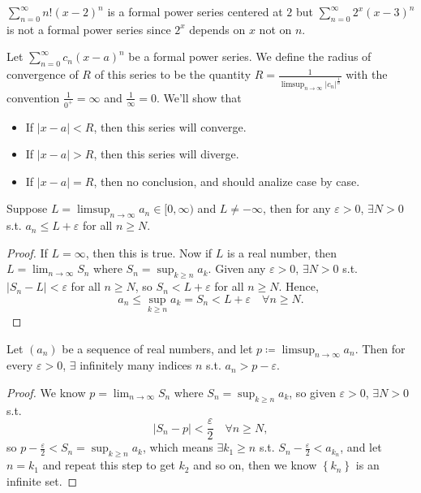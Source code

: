 \begin{eg}
    \(\sum_{n=0}^{\infty} n! (x-2)^n \) is a formal power series centered at \(2\) but \(\sum_{n=0}^{\infty} 2^x (x-3)^n \) is not a formal power series since \(2^x\) depends on \(x\) not on \(n\).      
\end{eg}

\begin{definition}
    Let \(\sum_{n=0}^{\infty} c_n(x-a)^n \) be a formal power series. We define the radius of convergence of \(R \) of this series to be the quantity \(R=\frac{1}{\limsup_{n \to \infty} \vert c_n \vert^{\frac{1}{n}} }\) with the convention \(\frac{1}{0^+} = \infty \) and \(\frac{1}{\infty } = 0\). We'll show that 
    \begin{itemize}
        \item If \(\vert x-a \vert < R\), then this series will converge. 
        \item If \(\vert x - a \vert > R \), then this series will diverge. 
        \item If \(\vert x-a \vert = R \), then no conclusion, and should analize case by case.   
    \end{itemize}   
\end{definition}

\begin{lemma} \label{lm: series approaches limsup}
    Suppose \(L = \limsup_{n \to \infty} a_n \in [0, \infty ) \) and \(L \neq -\infty \), then for any \(\varepsilon > 0\), \(\exists N > 0\) s.t. \(a_n \le L + \varepsilon \) for all \(n \ge N\).      
\end{lemma}
\begin{proof}
    If \(L = \infty \), then this is true. Now if \(L\) is a real number, then \(L = \lim_{n \to \infty} S_n \) where \(S_n = \sup _{k \ge n} a_k\). Given any \(\varepsilon > 0\), \(\exists N > 0\) s.t. \(\vert S_n - L \vert < \varepsilon  \) for all \(n \ge N\), so \(S_n < L + \varepsilon \) for all \(n \ge N\). Hence, 
    \[
        a_n \le \sup _{k \ge n} a_k = S_n < L + \varepsilon \quad \forall n \ge N.
    \]          
\end{proof}

\begin{lemma} \label{lm: given any veps we can find infinitely many an approach limsup in error veps}
    Let \((a_n)\) be a sequence of real numbers, and let \(p \coloneqq \limsup_{n \to \infty} a_n \). Then for every \(\varepsilon > 0\), \(\exists \) infinitely many indices \(n\) s.t. \(a_n > p - \varepsilon \).     
\end{lemma}
\begin{proof}
    We know \(p = \lim_{n \to \infty} S_n \) where \(S_n = \sup _{k \ge n} a_k\), so given \(\varepsilon > 0\), \(\exists N > 0\) s.t. 
    \[
        \left\vert S_n - p \right\vert < \frac{\varepsilon}{2} \quad \forall n \ge N,
    \] so \(p - \frac{\varepsilon}{2} < S_n = \sup _{k \ge n} a_k\), which means \(\exists k_1 \ge n\) s.t. \(S_n - \frac{\varepsilon}{2} < a_{k_n}\), and let \(n = k_1\) and repeat this step to get \(k_2\) and so on, then we know \(\left\{ k_n \right\} \) is an infinite set.     
\end{proof}


